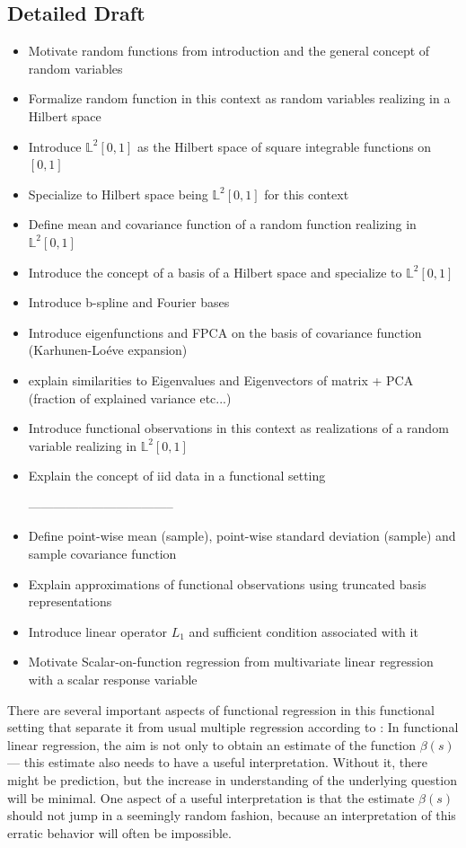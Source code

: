 \documentclass[11pt,twoside,a4paper]{article}
\begin{document}
	\subsection{Detailed Draft}
	\begin{itemize}
		\item Motivate random functions from introduction and the general concept of random variables
		\item Formalize random function in this context as random variables realizing in a Hilbert space
		\item Introduce $\mathbb{L}^2[0,1]$ as the Hilbert space of square integrable functions on $[0,1]$
		\item Specialize to Hilbert space being $\mathbb{L}^2[0,1]$ for this context
		\item Define mean and covariance function of a random function realizing in $\mathbb{L}^2[0,1]$
		\item Introduce the concept of a basis of a Hilbert space and specialize to $\mathbb{L}^2[0,1]$
		\item Introduce b-spline and Fourier bases
		\item Introduce eigenfunctions and FPCA on the basis of covariance function (Karhunen-Lo\'{e}ve expansion)
		\item explain similarities to Eigenvalues and Eigenvectors of matrix + PCA (fraction of explained variance etc...)
		\item Introduce functional observations in this context as realizations of a random variable realizing in $\mathbb{L}^2[0,1]$
		\item Explain the concept of iid data in a functional setting
		
-----------------------------------		
		
		\item Define point-wise mean (sample), point-wise standard deviation (sample) and sample covariance function
		\item Explain approximations of functional observations using truncated basis representations
		\item Introduce linear operator $L_1$ and sufficient condition associated with it
		\item Motivate Scalar-on-function regression from multivariate linear regression with a scalar response variable
	\end{itemize}

There are several important aspects of functional regression in this functional setting that separate it from usual multiple regression according to \cite{kokoszka_introduction_2017}: In functional linear regression, the aim is not only to obtain an estimate of the function $\beta(s)$ — this estimate also needs to have a useful interpretation. Without it, there might be prediction, but the increase in understanding of the underlying question will be minimal. One aspect of a useful interpretation is that the estimate $\beta(s)$ should not jump in a seemingly random fashion, because an interpretation of this erratic behavior will often be impossible.
\end{document}
